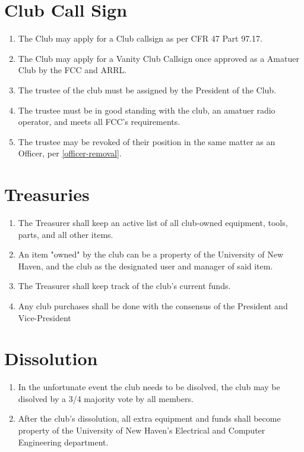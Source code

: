 \documentclass[a4paper,12pt]{article}
\begin{document}
\section{Club Call Sign}
\begin{enumerate}[label=\thesection.\arabic*.]
  \item The Club may apply for a Club callsign as per CFR 47 Part 97.17.
  \item The Club may apply for a Vanity Club Callsign once approved as a Amatuer Club by the FCC and ARRL.
  \item The trustee of the club must be assigned by the President of the Club.
  \item The trustee must be in good standing with the club, an amatuer radio operator, and meets all FCC's requirements.
  \item The trustee may be revoked of their position in the same matter as an Officer, per \cref{officer-removal}.
\end{enumerate}

\section{Treasuries}
\begin{enumerate}[label=\thesection.\arabic*.]
  \item The Treasurer shall keep an active list of all club-owned equipment, tools, parts, and all other items.
  \item An item "owned" by the club can be a property of the University of New Haven, and the club as the designated user and manager of said item.
  \item The Treasurer shall keep track of the club's current funds.
  \item Any club purchases shall be done with the consensus of the President and Vice-President
\end{enumerate}

\section{Dissolution}
\begin{enumerate}[label=\thesection.\arabic*.]
  \item In the unfortunate event the club needs to be disolved, the club may be disolved by a 3/4 majority vote by all members.
  \item After the club's dissolution, all extra equipment and funds shall become property of the University of New Haven's Electrical and Computer Engineering department.
\end{enumerate}
\end{document}
